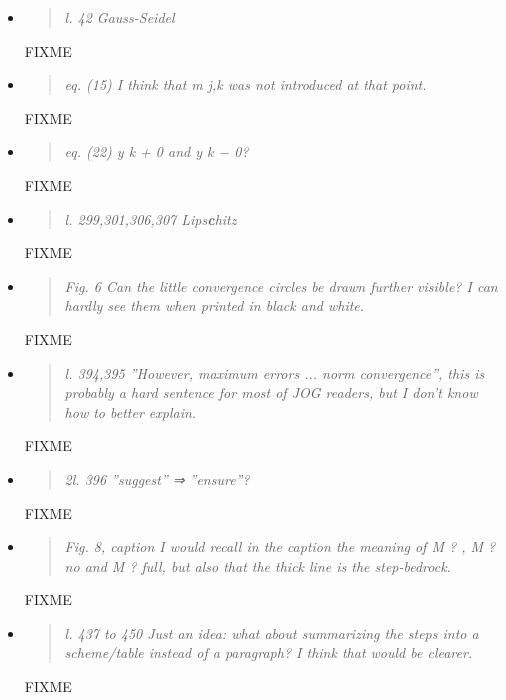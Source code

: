 \documentclass[11pt,reqno]{amsart}
\newcommand{\reply}[2]{
\medskip\medskip
\item  \begin{quote}
\emph{#1}
\end{quote}

\medskip
\noindent #2}
\begin{document}
\begin{itemize}
\reply{l. 42 Gauss-Seidel}
{FIXME}

\reply{eq. (15) I think that m j,k was not introduced at that point.}
{FIXME}

\reply{eq. (22) y k + 0 and y k − 0?}
{FIXME}

\reply{l. 299,301,306,307 Lips\textbf{c}hitz}
{FIXME}

\reply{Fig. 6 Can the little convergence circles be drawn further visible? I can hardly see them
when printed in black and white.}
{FIXME}

\reply{l. 394,395 ”However, maximum errors ... norm convergence”, this is probably a hard sentence for most of JOG readers, but I don’t know how to better explain.}
{FIXME}

\reply{2l. 396 ”suggest” ⇒ ”ensure”?}
{FIXME}

\reply{Fig. 8, caption I would recall in the caption the meaning of M ? , M ? no and M ? full, but also that
the thick line is the step-bedrock.}
{FIXME}

\reply{l. 437 to 450 Just an idea: what about summarizing the steps into a scheme/table instead of
a paragraph? I think that would be clearer.}
{FIXME}

\end{itemize}
\end{document}
